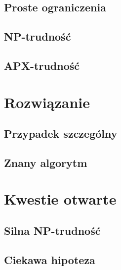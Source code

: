 \documentclass{beamer}
\begin{document}
	\subsection{Proste ograniczenia}
	\subsection{NP-trudność}
	\subsection{APX-trudność}
\section{Rozwiązanie}
	\subsection{Przypadek szczególny}
	\subsection{Znany algorytm}
\section{Kwestie otwarte}
	\subsection{Silna NP-trudność}
	\subsection{Ciekawa hipoteza}
\end{document}
